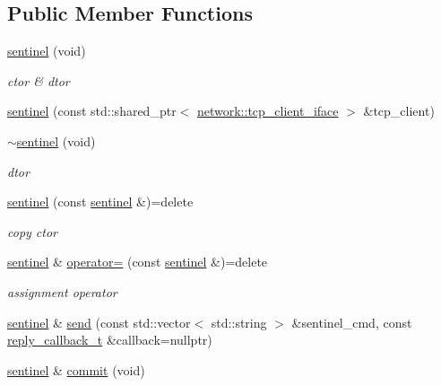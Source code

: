 \subsection*{Public Member Functions}
\begin{DoxyCompactItemize}
\item 
\hyperlink{classcpp__redis_1_1sentinel_a2ea5a80a9139d5192706988521a2ae34}{sentinel} (void)
\begin{DoxyCompactList}\small\item\em ctor \& dtor \end{DoxyCompactList}\item 
\hyperlink{classcpp__redis_1_1sentinel_af53665f5834dfe5861a6310318ae5169}{sentinel} (const std\+::shared\+\_\+ptr$<$ \hyperlink{classcpp__redis_1_1network_1_1tcp__client__iface}{network\+::tcp\+\_\+client\+\_\+iface} $>$ \&tcp\+\_\+client)
\item 
\hyperlink{classcpp__redis_1_1sentinel_af8535e89714db8ddcd7e74337ee5385a}{$\sim$sentinel} (void)
\begin{DoxyCompactList}\small\item\em dtor \end{DoxyCompactList}\item 
\hyperlink{classcpp__redis_1_1sentinel_a4c3b68f6e930b2e9723816bb8bed5a8f}{sentinel} (const \hyperlink{classcpp__redis_1_1sentinel}{sentinel} \&)=delete
\begin{DoxyCompactList}\small\item\em copy ctor \end{DoxyCompactList}\item 
\hyperlink{classcpp__redis_1_1sentinel}{sentinel} \& \hyperlink{classcpp__redis_1_1sentinel_a06b8d049160e3990cdac3158aaf160a6}{operator=} (const \hyperlink{classcpp__redis_1_1sentinel}{sentinel} \&)=delete
\begin{DoxyCompactList}\small\item\em assignment operator \end{DoxyCompactList}\item 
\hyperlink{classcpp__redis_1_1sentinel}{sentinel} \& \hyperlink{classcpp__redis_1_1sentinel_a0df522dbd7debda4e73f616a62d6f5ee}{send} (const std\+::vector$<$ std\+::string $>$ \&sentinel\+\_\+cmd, const \hyperlink{classcpp__redis_1_1sentinel_ae1a150ff8787208c47414397a061c9a7}{reply\+\_\+callback\+\_\+t} \&callback=nullptr)
\item 
\hyperlink{classcpp__redis_1_1sentinel}{sentinel} \& \hyperlink{classcpp__redis_1_1sentinel_ad4f85d486499f82225b244f85091b31e}{commit} (void)

\end{DoxyCompactItemize}
